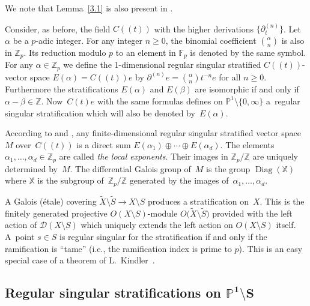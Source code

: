 \documentclass[pdftex]{sigma}
\numberwithin{equation}{section}
\begin{document}
We note that Lemma~\ref{3.1} is also present in \cite[Proposition 3.2.3]{K}.

Consider, as before, the field $C((t))$ with the higher derivations $\big\{\partial_t ^{(n)}\big\}$. Let~$\alpha$ be a $p$-adic integer. For any integer $n\geq 0$, the binomial coefficient ${\alpha \choose n}$ is also in $\mathbb{Z}_p$. Its reduction modulo $p$ to an element in $\mathbb{F}_p$ is denoted by the same symbol. For any $\alpha \in \mathbb{Z}_p$ we define the 1-dimensional regular singular stratified $C((t))$-vector space $E(\alpha )=C((t))e$ by $\partial ^{(n)}e={\alpha \choose n }t^{-n}e$ for all $n\geq 0$. Furthermore the stratifications $E(\alpha )$ and $E(\beta)$ are isomorphic if and only if $\alpha -\beta \in \mathbb{Z}$. Now~$C(t)e$ with the same formulas defines on $\mathbb{P}^1\setminus \{0,\infty \}$ a~regular singular stratification which will also be denoted by~$E(\alpha )$.

According to \cite[Theorem 3.3]{Gie} and \cite[Proposition 6.1]{Ma-vdP1}, any finite-dimensional regular singular stratified vector space~$M$ over~$C((t))$ is a direct sum $E(\alpha _1)\oplus \cdots \oplus E(\alpha _d)$. The elements $\alpha_1,\dots ,\alpha _d\in \mathbb{Z}_p$ are called {\it the local exponents}. Their images in $\mathbb{Z}_p/\mathbb{Z}$ are uniquely determined by~$M$. The differential Galois group of~$M$ is the group $\operatorname{Diag}(\mathbb{X})$ where $\mathbb{X}$ is the subgroup of~$\mathbb{Z}_p/\mathbb{Z}$ generated by the images of~$\alpha_1,\dots ,\alpha _d$.

A Galois (\'etale) covering $\tilde{X}\setminus \tilde{S}\rightarrow X\setminus S$ produces a stratification on~$X$. This is the finitely generated projective $O(X\setminus S)$-module $O\big(\tilde{X}\setminus \tilde{S}\big)$ provided with the left action of $\mathcal{D}(X\setminus S)$ which uniquely extends the left action on $O(X\setminus S)$ itself. A~point $s\in S$ is regular singular for the stratification if and only if the ramification is ``tame'' (i.e., the ramification index is prime to $p$). This is an easy special case of a theorem of L.~Kindler~\cite{Ki}.

 \subsection[Regular singular stratifications on $\mathbb{P}^1\setminus S$]{Regular singular stratifications on $\boldsymbol{\mathbb{P}^1\setminus S}$}\label{section3.1}
\end{document}
